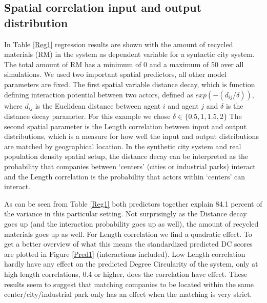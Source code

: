 \documentclass[fleqn,10pt]{wlscirep}
\begin{document}
{\subsection*{Spatial correlation input and output distribution}

In Table \ref{Reg1} regression results are shown with the amount of recycled materials (RM) in the system as dependent variable for a syntactic city system. The total amount of RM has a minimum of 0 and a maximum of 50 over all simulations. We used two important spatial predictors, all other model parameters are fixed. The first spatial variable distance decay, which is function defining interaction potential between two actors, defined as $exp(-(d_{ij}/\delta))$, where $d_{ij}$ is the Euclidean distance between agent $i$ and agent $j$ and $\delta$ is the distance decay parameter. For this example we chose $\delta \in \{0.5, 1, 1.5, 2\}$ The second spatial parameter is the Length correlation between input and output distributions, which is a measure for how well the input and output distributions are matched by geographical location. In the synthetic city system and real population density spatial setup, the distance decay can be interpreted as the probability that companies between `centers' (cities or industrial parks) interact and the Length correlation is the probability that actors within `centers' can interact. 

As can be seen from Table \ref{Reg1} both predictors together explain 84.1 percent of the variance in this particular setting. Not surprisingly as the Distance decay goes up (and the interaction probability goes up as well), the amount of recycled materials goes up as well. For Length correlation we find a quadratic effect. To get a better overview of what this means the standardized predicted DC scores are plotted in Figure \ref{Pred1} (interactions included). Low Length correlation hardly have any effect on the predicted Degree Circularity of the system, only at high length correlations, 0.4 or higher, does the correlation have effect. These results seem to suggest that matching companies to be located within the same center/city/industrial park only has an effect when the matching is very strict.  

}
\end{document}
